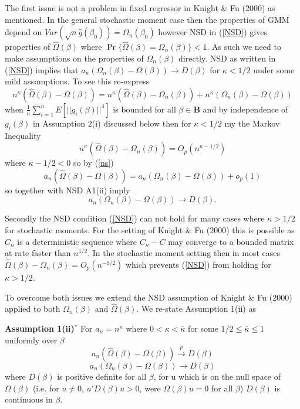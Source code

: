 \documentclass[11pt, fleqn]{article}
\begin{document}
The first issue is not a problem in fixed regressor in Knight \& Fu (2000) as mentioned. In the general stochastic moment case then  the properties of GMM depend on $Var(\sqrt{n}\hat{g}(\beta_0))=\Omega_n(\beta_0)$ however NSD in (\ref{NSD}) gives properties of $\hat{\Omega}(\beta)$ where $\Pr\{\hat{\Omega}(\beta)=\Omega_n(\beta)\}<1$.  As such we need to make assumptions on  the properties of $\Omega_n(\beta)$ directly. NSD as written in (\ref{NSD}) implies that $a_n(\Omega_n(\beta)-\Omega(\beta))\rightarrow D(\beta)$ for $\kappa<1/2$  under some mild assumptions. To see this re-express
\begin{equation} \label{ns} n^{\kappa}(\hat{\Omega}(\beta)-\Omega(\beta))=n^{\kappa}(\hat{\Omega}(\beta)-\Omega_n(\beta))+n^{\kappa}(\Omega_n(\beta)-\Omega(\beta)) \end{equation}
when $\frac{1}{n}\sum_{i=1}^n E[|\!|g_i(\beta)|\!|^4]$ is bounded  for all $\beta \in \mathbf{B}$ and by independence of $g_i(\beta)$  in Assumption 2(i) discussed below then for  $\kappa<1/2$  my the Markov Inequality  \begin{equation*}n^{\kappa}(\hat{\Omega}(\beta)-\Omega_n(\beta))=O_p(n^{\kappa-1/2}) \end{equation*} where $\kappa-1/2<0$ so by (\ref{ns})
\begin{equation}a_n(\hat{\Omega}(\beta)-\Omega(\beta))=a_n(\Omega_n(\beta)-\Omega(\beta))+o_p(1) \end{equation}
 so together with NSD A1(ii) imply \begin{equation} a_n(\Omega_n(\beta)-\Omega(\beta))\rightarrow D(\beta). \end{equation}



Secondly the NSD condition (\ref{NSD}) can not hold for many cases where  $\kappa>1/2$  for stochastic moments. For the setting of Knight \& Fu (2000) this is possible as $C_n$ is a deterministic sequence where $C_n-C$ may converge to a bounded matrix at rate faster than $n^{1/2}$. In the stochastic moment setting then in most cases $\hat{\Omega}(\beta)-\Omega_n(\beta)=O_p(n^{-1/2})$ which prevents (\ref{NSD}) from holding for $\kappa>1/2$.


To overcome both issues we  extend the NSD assumption of Knight \& Fu (2000) applied to  both $\Omega_n(\beta)$ and  $\hat{\Omega}(\beta)$. We re-state Assumption 1(ii) as

\textbf{Assumption 1(ii)$^*$}
 For $a_n=n^{\kappa}$ where $0<\kappa<\bar{\kappa}$ for some $1/2\leq\bar{\kappa}\leq 1$ uniformly over $\beta$
\begin{equation} \label{NSD1} a_n(\hat{\Omega}(\beta)-\Omega(\beta))\overset{p}{\rightarrow}D(\beta)\end{equation}
\begin{equation} \label{NSD2} a_n(\Omega_n(\beta)-\Omega(\beta))\rightarrow D(\beta)\end{equation}
where $D(\beta)$ is positive definite for all $\beta$,  for u which is on the null space of $\Omega(\beta)$ (i.e. for $u\neq 0$, $u'D(\beta)u>0$, were $\Omega(\beta)u=0$ for all $\beta$) $D(\beta)$ is continuous in $\beta$.\\
\end{document}
